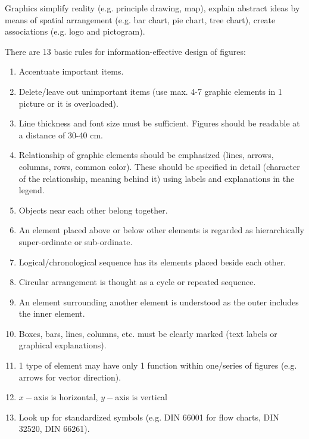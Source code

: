 Graphics simplify reality (e.g. principle drawing, map), explain abstract ideas by means of spatial arrangement (e.g. bar chart, pie chart, tree chart), create associations (e.g. logo and pictogram).

There are 13 basic rules for information-effective design of figures:
\begin{enumerate}
	\item Accentuate important items.
	\item Delete/leave out unimportant items (use max. 4-7 graphic elements in 1 picture or it is overloaded).
	\item Line thickness and font size must be sufficient. Figures should be readable at a distance of 30-40 cm.
	\item Relationship of graphic elements should be emphasized (lines, arrows, columns, rows, common color). These should be specified in detail (character of the relationship, meaning behind it) using labels and explanations in the legend.
	\item Objects near each other belong together.
	\item An element placed above or below other elements is regarded as hierarchically super-ordinate or sub-ordinate.
	\item Logical/chronological sequence has its elements placed beside each other.
	\item Circular arrangement is thought as a cycle or repeated sequence.
	\item An element surrounding another element is understood as the outer includes the inner element.
	\item Boxes, bars, lines, columns, etc. must be clearly marked (text labels or graphical explanations).
	\item 1 type of element may have only 1 function within one/series of figures (e.g. arrows for vector direction).
	\item $ x- $axis is horizontal, $ y- $axis is vertical
	\item Look up for standardized symbols (e.g. DIN 66001 for flow charts, DIN 32520, DIN 66261).
\end{enumerate}
